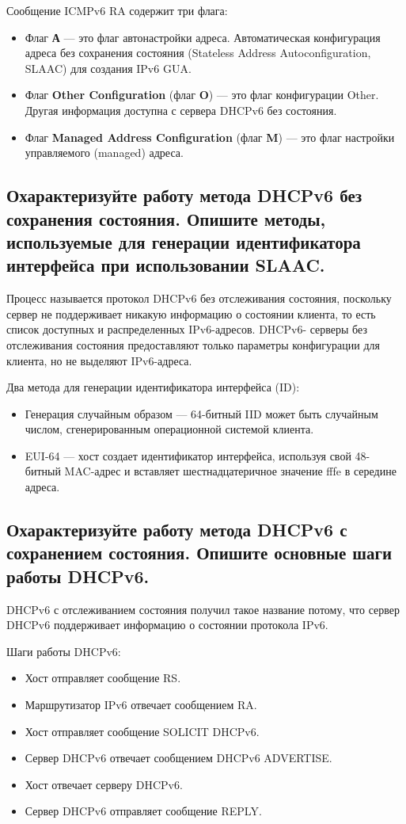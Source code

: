 Сообщение ICMPv6 RA содержит три флага:
\begin{itemize}
    \item Флаг \textbf{А} --- это флаг автонастройки адреса. Автоматическая
    конфигурация адреса без сохранения состояния (Stateless Address
    Autoconfiguration, SLAAC) для создания IPv6 GUA.
    \item Флаг \textbf{Other Configuration} (флаг \textbf{O})
    --- это флаг конфигурации
    Other. Другая информация доступна с сервера DHCPv6 без
    состояния.
    \item Флаг \textbf{Managed Address Configuration} (флаг \textbf{M})
    --- это флаг настройки управляемого (managed) адреса.
\end{itemize}

\subsection{Охарактеризуйте работу метода DHCPv6 без сохранения
состояния. Опишите методы, используемые для генерации
идентификатора интерфейса при использовании SLAAC.}
Процесс называется протокол DHCPv6 без отслеживания состояния,
поскольку сервер не поддерживает никакую информацию о состоянии
клиента, то есть список доступных и распределенных IPv6-адресов. DHCPv6-
серверы без отслеживания состояния предоставляют только параметры
конфигурации для клиента, но не выделяют IPv6-адреса.

Два метода для генерации идентификатора интерфейса (ID):
\begin{itemize}
    \item Генерация случайным образом --- 64-битный IID может быть
    случайным числом, сгенерированным операционной системой
    клиента.
    \item EUI-64 --- хост создает идентификатор интерфейса, используя
    свой 48-битный MAC-адрес и вставляет шестнадцатеричное
    значение fffe в середине адреса.
\end{itemize}

\subsection{Охарактеризуйте работу метода DHCPv6 с сохранением
состояния. Опишите основные шаги работы DHCPv6.}
DHCPv6 с отслеживанием состояния получил такое название потому,
что сервер DHCPv6 поддерживает информацию о состоянии протокола IPv6.

Шаги работы DHCPv6:
\begin{itemize}
    \item Хост отправляет сообщение RS.
    \item Маршрутизатор IPv6 отвечает сообщением RA.
    \item Хост отправляет сообщение SOLICIT DHCPv6.
    \item Сервер DHCPv6 отвечает сообщением DHCPv6 ADVERTISE.
    \item Хост отвечает серверу DHCPv6.
    \item Сервер DHCPv6 отправляет сообщение REPLY.
\end{itemize}

